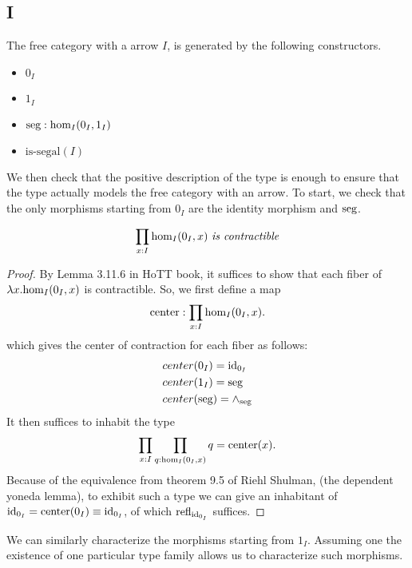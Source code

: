 \documentclass[main.tex]{subfiles}
\begin{document}
\subsection{I}
The free category with a arrow $I$, is generated by the following constructors.
\begin{itemize}
    \item $0_I$
    \item $1_I$
    \item $\seg : \ho[I]{0_I}{1_I}$
    \item $\text{is-segal}(I)$
\end{itemize}
We then check that the positive description of the type is enough to ensure that the type actually models the free category with an arrow. To start, we check that the only morphisms starting from $0_I$ are the identity morphism and $\seg$.
\begin{lemma}
\[
\prod_{x:I}\ho[I]{0_I}{x}\text{ \emph{is contractible}}
\]
\end{lemma}
\begin{proof}
    By Lemma 3.11.6 in HoTT book, it suffices to show that each fiber of $\lambda x. \ho[I]{0_I}{x}$ is contractible. So, we first define a map $$\text{center} : \displaystyle \prod_{x:I}\ho[I]{0_I}{x}.$$
    which gives the center of contraction for each fiber as follows:
    \begin{align*}
        &center(0_I) = \id{0_I}\\
        &center(1_I) = \seg\\
        &center(\seg) = \land_\seg
    \end{align*}
    It then suffices to inhabit the type
    $$\prod_{x:I}\prod_{q:\ho[I]{0_I}{x}}q=\text{center}(x).$$
    Because of the equivalence from theorem 9.5 of Riehl Shulman, (the dependent yoneda lemma), to exhibit such a type we can give an inhabitant of $\id{0_I}=\text{center}(0_I) \equiv \id{0_I}$, of which $\refl{\id{0_I}}$ suffices.
\end{proof}
We can similarly characterize the morphisms starting from $1_I$. Assuming one the existence of one particular type family allows us to characterize such morphisms.
\end{document}
